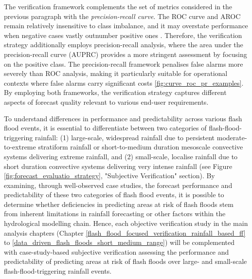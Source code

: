 The  verification framework complements the set of metrics considered in the previous paragraph with the \textit{precision-recall curve}. The ROC curve and AROC remain relatively insensitive to class imbalance, and it may overstate performance when negative cases vastly outnumber positive ones \citep{Saito_2015}. Therefore, the verification strategy additionally employs precision-recall analysis, where the area under the precision-recall curve (AUPRC) provides a more stringent assessment by focusing on the positive class. The precision-recall framework penalises false alarms more severely than ROC analysis, making it particularly suitable for operational contexts where false alarms carry significant costs \ref{fig:curve_roc_pr_examples}. By employing both frameworks, the verification strategy captures different aspects of forecast quality relevant to various end-user requirements.

To  understand differences in performance and predictability across various flash flood events, it is essential to differentiate between two categories of flash-flood-triggering rainfall: (1) large-scale, widespread rainfall due to persistent moderate-to-extreme stratiform rainfall or short-to-medium duration mesoscale convective systems delivering extreme rainfall, and (2) small-scale, localise rainfall due to short duration convective systems delivering very intense rainfall (see Figure \ref{fig:forecast_evaluatio_strategy}, "Subjective Verification" section). By examining, through well-observed case studies, the forecast performance and predictability of these two categories of flash flood events, it is possible to determine whether deficiencies in predicting areas at risk of flash floods stem from inherent limitations in rainfall forecasting or other factors within the hydrological modelling chain. Hence, each objective verification study in the main analysis chapters (Chapter \ref{flash_flood_focused_verification_rainfall_based_ff} to \ref{data_driven_flash_floods_short_medium_range}) will be complemented with case-study-based subjective verification assessing the performance and predictability of predicting areas at risk of flash floods over large- and small-scale flash-flood-triggering rainfall events.


